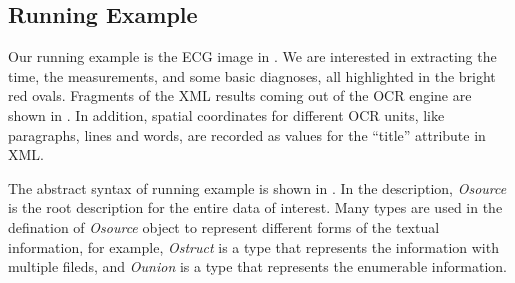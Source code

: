 \subsection{Running Example}
Our running example is the ECG image in . 
We are interested in extracting the time, the measurements, 
and some basic diagnoses, all highlighted in the bright red ovals.
Fragments of the XML results coming out of the OCR engine are shown 
in . In addition, spatial coordinates for different 
OCR units, like paragraphs, lines and words, are recorded as values  
for the ``title'' attribute in XML. 

The abstract syntax of running example is shown in . 
In the description, 
{\em Osource} is the root description for the entire data of interest. 
Many types are used in the defination of {\em Osource} object to represent 
different forms of the textual information, for example, {\em Ostruct} is a type that 
represents the information with multiple fileds, and {\em Ounion} is a 
type that represents the enumerable information. 

%
%



  



